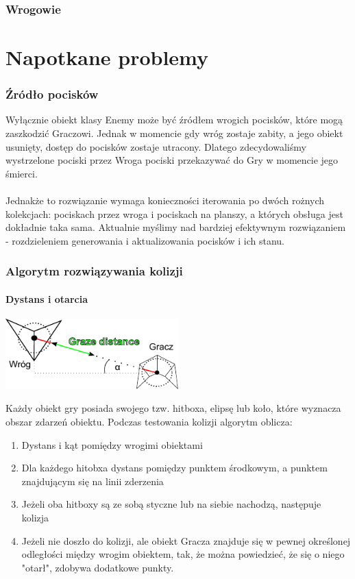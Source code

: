 \documentclass[a4paper,twoside]{article}
\begin{document}
		\section{Wrogowie}
			
	
	
	\newpage
	\part{Napotkane problemy}
		\section{Źródło pocisków}
			Wyłącznie obiekt klasy Enemy może być źródłem wrogich pocisków, które mogą zaszkodzić Graczowi. Jednak w momencie gdy wróg zostaje zabity, a jego obiekt usunięty, dostęp do pocisków zostaje utracony. Dlatego zdecydowaliśmy wystrzelone pociski przez Wroga pociski przekazywać do Gry w momencie jego śmierci.\\\\
			Jednakże to rozwiązanie wymaga konieczności iterowania po dwóch rożnych kolekcjach: pociskach przez wroga i pociskach na planszy, a których obsługa jest dokładnie taka sama. Aktualnie myślimy nad bardziej efektywnym rozwiązaniem - rozdzieleniem generowania i aktualizowania pocisków i ich stanu.
	
	
		\section{Algorytm rozwiązywania kolizji}
			\subsection{Dystans i otarcia}
				\begin{center}
					\includegraphics[width=0.5\textwidth]{./images/kolizje01}
				\end{center}
				Każdy obiekt gry posiada swojego tzw. hitboxa, elipsę lub koło, które wyznacza obszar zdarzeń obiektu. Podczas testowania kolizji algorytm oblicza:
				\begin{enumerate}
					\item Dystans i kąt pomiędzy wrogimi obiektami
					\item Dla każdego hitobxa dystans pomiędzy punktem środkowym, a punktem znajdującym się na linii zderzenia
					\item Jeżeli oba hitboxy są ze sobą styczne lub na siebie nachodzą, następuje kolizja
					\item Jeżeli nie doszło do kolizji, ale obiekt Gracza znajduje się w pewnej określonej odległości między wrogim obiektem, tak, że można powiedzieć, że się o niego "otarł", zdobywa dodatkowe punkty.
				\end{enumerate}
\end{document}
